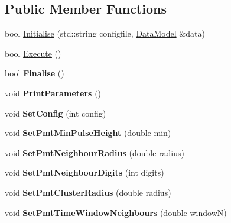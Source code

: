 \subsection*{Public Member Functions}
\begin{DoxyCompactItemize}
\item 
bool \hyperlink{classHitCleaner_a35bd6ca1401c52439166e51c7e873ace}{Initialise} (std::string configfile, \hyperlink{classDataModel}{DataModel} \&data)
\item 
bool \hyperlink{classHitCleaner_adec5b94400dcbfc710590d7eb387041b}{Execute} ()
\item 
\hypertarget{classHitCleaner_a06d16e3d574ec685952c011d2309fa76}{
bool {\bfseries Finalise} ()}
\label{classHitCleaner_a06d16e3d574ec685952c011d2309fa76}

\item 
\hypertarget{classHitCleaner_a2d7f24be0dae3a9aa53771bc0bdb65c6}{
void {\bfseries PrintParameters} ()}
\label{classHitCleaner_a2d7f24be0dae3a9aa53771bc0bdb65c6}

\item 
\hypertarget{classHitCleaner_af75191aadcf2acffcc1c13549d062fc8}{
void {\bfseries SetConfig} (int config)}
\label{classHitCleaner_af75191aadcf2acffcc1c13549d062fc8}

\item 
\hypertarget{classHitCleaner_acb667165fb7166a54b5401264c76cf60}{
void {\bfseries SetPmtMinPulseHeight} (double min)}
\label{classHitCleaner_acb667165fb7166a54b5401264c76cf60}

\item 
\hypertarget{classHitCleaner_a48ecb1833030a1e53d76f852735b1146}{
void {\bfseries SetPmtNeighbourRadius} (double radius)}
\label{classHitCleaner_a48ecb1833030a1e53d76f852735b1146}

\item 
\hypertarget{classHitCleaner_a05aaf25ef5464e2cc0cbb67a123a4683}{
void {\bfseries SetPmtNeighbourDigits} (int digits)}
\label{classHitCleaner_a05aaf25ef5464e2cc0cbb67a123a4683}

\item 
\hypertarget{classHitCleaner_a374f2c25fd741ba89253c1df57c2f711}{
void {\bfseries SetPmtClusterRadius} (double radius)}
\label{classHitCleaner_a374f2c25fd741ba89253c1df57c2f711}

\item 
\hypertarget{classHitCleaner_a2034dc5fabc9bd6a7f06bfe9be9172f4}{
void {\bfseries SetPmtTimeWindowNeighbours} (double windowN)}
\label{classHitCleaner_a2034dc5fabc9bd6a7f06bfe9be9172f4}


\end{DoxyCompactItemize}
